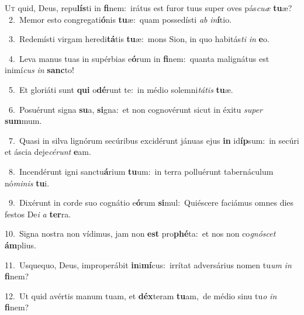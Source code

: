 \lettrine{\initial\textcolor{\initialcolor}{U}}{t} quid, Deus, repu\-\textbf{lís}\-ti in \textbf{fi}\-nem:~\star irátus est furor tuus super oves pás\-\textit{cu}\-\textit{æ} \textbf{tu}\-æ?\\
{\numbfont\textcolor{\numbcolor}{~2.}}~Memor esto congregati\-\textbf{ó}\-nis \textbf{tu}\-æ:~\star quam possedísti \textit{ab} \textit{in}\-\textbf{í}tio.\par
{\numbfont\textcolor{\numbcolor}{~3.}}~Redemísti virgam heredi\-\textbf{tá}\-tis \textbf{tu}\-æ:~\star mons Sion, in quo habitás\textit{ti} \textit{in} \textbf{e}\-o.\par
{\numbfont\textcolor{\numbcolor}{~4.}}~Leva manus tuas in supérbias e\-\textbf{ó}\-rum in \textbf{fi}\-nem:~\star quanta malignátus est inimí\textit{cus} \textit{in} \textbf{sanc}\-to!\par
{\numbfont\textcolor{\numbcolor}{~5.}}~Et gloriáti sunt \textbf{qui} o\-\textbf{dé}\-runt te:~\star in médio solemni\-\textit{tá}\-\textit{tis} \textbf{tu}\-æ.\par
{\numbfont\textcolor{\numbcolor}{~6.}}~Posuérunt signa \textbf{su}\-a, \textbf{si}\-gna:~\star et non cognovérunt sicut in éxitu \textit{su}\-\textit{per} \textbf{sum}\-mum.\par
{\numbfont\textcolor{\numbcolor}{~7.}}~Quasi in silva lignórum secúribus excidérunt jánuas ejus \textbf{in} id\-\textbf{íp}\-sum:~\star in secúri et áscia deje\-\textit{cé}\-\textit{runt} \textbf{e}\-am.\par
{\numbfont\textcolor{\numbcolor}{~8.}}~Incendérunt igni sanctu\-\textbf{á}\-rium \textbf{tu}\-um:~\star in terra polluérunt tabernáculum nó\-\textit{mi}\-\textit{nis} \textbf{tu}\-i.\par
{\numbfont\textcolor{\numbcolor}{~9.}}~Dixérunt in corde suo cognátio e\-\textbf{ó}\-rum \textbf{si}\-mul:~\star Quiéscere faciámus omnes dies festos De\textit{i} \textit{a} \textbf{ter}\-ra.\par
{\numbfont\textcolor{\numbcolor}{10.}}~Signa nostra non vídimus, jam non \textbf{est} pro\-\textbf{phé}\-ta:~\star et nos non co\-\textit{gnó}\-\textit{scet} \textbf{ám}\-plius.\par
{\numbfont\textcolor{\numbcolor}{11.}}~Usquequo, Deus, improperábit \textbf{in}\-i\-\textbf{mí}\-cus:~\star irrítat adversárius nomen tu\textit{um} \textit{in} \textbf{fi}\-nem?\par
{\numbfont\textcolor{\numbcolor}{12.}}~Ut quid avértis manum tuam, et \textbf{déx}\-teram \textbf{tu}\-am,~\star de médio sinu tu\textit{o} \textit{in} \textbf{fi}\-nem?\par
